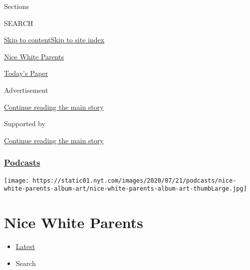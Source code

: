 Sections

SEARCH

\protect\hyperlink{site-content}{Skip to
content}\protect\hyperlink{site-index}{Skip to site index}

\href{https://www.nytimes.com/column/nice-white-parents}{Nice White
Parents}

\href{https://myaccount.nytimes.com/auth/login?response_type=cookie\&client_id=vi}{}

\href{https://www.nytimes.com/section/todayspaper}{Today's Paper}

Advertisement

\protect\hyperlink{after-top}{Continue reading the main story}

Supported by

\protect\hyperlink{after-sponsor}{Continue reading the main story}

\hypertarget{podcasts}{%
\subsubsection{\texorpdfstring{\href{/spotlight/podcasts}{Podcasts}}{Podcasts}}\label{podcasts}}

\texttt{[image: https://static01.nyt.com/images/2020/07/21/podcasts/nice-white-parents-album-art/nice-white-parents-album-art-thumbLarge.jpg]}

\hypertarget{nice-white-parents}{%
\section{Nice White Parents}\label{nice-white-parents}}

\begin{itemize}
\tightlist
\item
  \protect\hyperlink{stream-panel}{Latest}
\item
  Search
\end{itemize}

